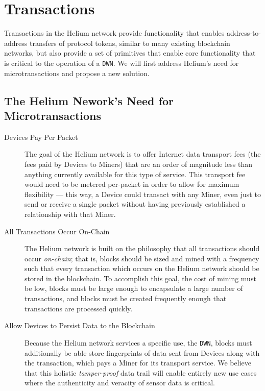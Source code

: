 \documentclass[10pt, nonatbib, nocopyrightspace, reprint]{sigplanconf}
\begin{document}
\section{Transactions}\label{transactions}

Transactions in the Helium network provide functionality that enables address-to-address transfers of protocol tokens, similar to many existing blockchain networks, but also provide a set of primitives that enable core functionality that is critical to the operation of a \verb|DWN|. We will first address Helium's need for microtransactions and propose a new solution.

\subsection{The Helium Nework's Need for Microtransactions}

\begin{description}

\item [Devices Pay Per Packet] The goal of the Helium network is to offer Internet data transport fees (the fees paid by Devices to Miners) that are an order of magnitude less than anything currently available for this type of service. This transport fee would need to be metered per-packet in order to allow for maximum flexibility --- this way, a Device could transact with any Miner, even just to send or receive a single packet without having previously established a relationship with that Miner.

\item [All Transactions Occur On-Chain] The Helium network is built on the philosophy that all transactions should occur \emph{on-chain}; that is, blocks should be sized and mined with a frequency such that every transaction which occurs on the Helium network should be stored in the blockchain.  To accomplish this goal, the cost of mining must be low, blocks must be large enough to encapsulate a large number of transactions, and blocks must be created frequently enough that transactions are processed quickly.

\item [Allow Devices to Persist Data to the Blockchain] Because the Helium network services a specific use, the \verb|DWN|, blocks must additionally be able store fingerprints of data sent from Devices along with the transaction, which pays a Miner for its transport service.  We believe that this holistic \emph{tamper-proof} data trail will enable entirely new use cases where the authenticity and veracity of sensor data is critical.

\end{description}
\end{document}
